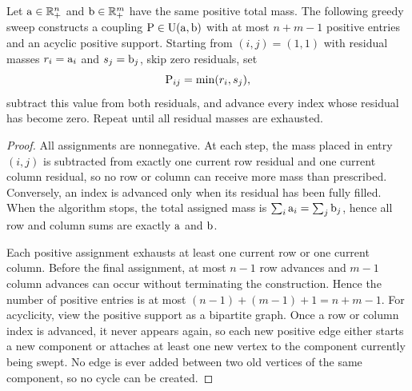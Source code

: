 \begin{prop}\label{prop-northwest-corner}
	Let $\a\in\RR_+^n$ and $\b\in\RR_+^m$ have the same positive total mass. The following greedy sweep constructs a coupling $\P\in\CouplingsD(\a,\b)$ with at most $n+m-1$ positive entries and an acyclic positive support. Starting from $(i,j)=(1,1)$ with residual masses $r_i=\a_i$ and $s_j=\b_j$, skip zero residuals, set
	\[
		\P_{ij}=\min(r_i,s_j),
	\]
	subtract this value from both residuals, and advance every index whose residual has become zero. Repeat until all residual masses are exhausted.
\end{prop}
\begin{proof}
	All assignments are nonnegative. At each step, the mass placed in entry $(i,j)$ is subtracted from exactly one current row residual and one current column residual, so no row or column can receive more mass than prescribed. Conversely, an index is advanced only when its residual has been fully filled. When the algorithm stops, the total assigned mass is $\sum_i \a_i=\sum_j \b_j$, hence all row and column sums are exactly $\a$ and $\b$.

	Each positive assignment exhausts at least one current row or one current column. Before the final assignment, at most $n-1$ row advances and $m-1$ column advances can occur without terminating the construction. Hence the number of positive entries is at most $(n-1)+(m-1)+1=n+m-1$. For acyclicity, view the positive support as a bipartite graph. Once a row or column index is advanced, it never appears again, so each new positive edge either starts a new component or attaches at least one new vertex to the component currently being swept. No edge is ever added between two old vertices of the same component, so no cycle can be created.
\end{proof}

